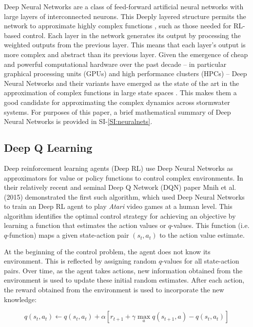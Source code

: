 Deep Neural Networks are a class of feed-forward artificial neural networks with large layers of interconnected neurons.
This Deeply layered structure permits the network to approximate highly complex functions \cite{hornik1989multilayer}, such as those needed for RL-based control.
Each layer in the network generates its output by processing the weighted outputs from the previous layer.
This means that each layer's output is more complex and abstract than its previous layer.
Given the emergence of cheap and powerful computational hardware over the past decade -- in particular graphical processing units (GPUs) and high performance clusters (HPCs) -- Deep Neural Networks and their variants have emerged as the state of the art in the approximation of complex functions in large state spaces \cite{LeCun2015DeepLearning}.
This makes them a good candidate for approximating the complex dynamics across stormwater systems. For purposes of this paper, a brief mathematical summary of Deep Neural Networks is provided in SI-\ref{SI:neuralnets}.

\subsection{\textbf{Deep Q Learning}}

Deep reinforcement learning agents (Deep RL) use Deep Neural Networks as approximators for value or policy functions to control complex environments.
In their relatively recent and seminal Deep Q Network (DQN) paper Mnih et al. (2015) \cite{Mnih2015} demonstrated the first such algorithm, which used Deep Neural Networks to train an Deep RL agent to play \textit{Atari} video games at a human level.
This algorithm identifies the optimal control strategy for achieving an objective by learning a function that estimates the action values or $q$-values.
This function (i.e. $q$-function) maps a given state-action pair $(s_t,a_t)$ to the action value estimate.

At the beginning of the control problem, the agent does not know its environment.
This is reflected by assigning random $q$-values for all state-action pairs.
Over time, as the agent takes actions, new information obtained from the environment is used to update these initial random estimates.
After each action, the reward obtained from the environment is used to incorporate the new knowledge:

\begin{equation}
    q(s_t,a_t ) \leftarrow q(s_t,a_t ) + \alpha \left[ r_{t+1}+\gamma  \max_a q(s_{t+1},a) - q(s_t,a_t ) \right]
\end{equation}

